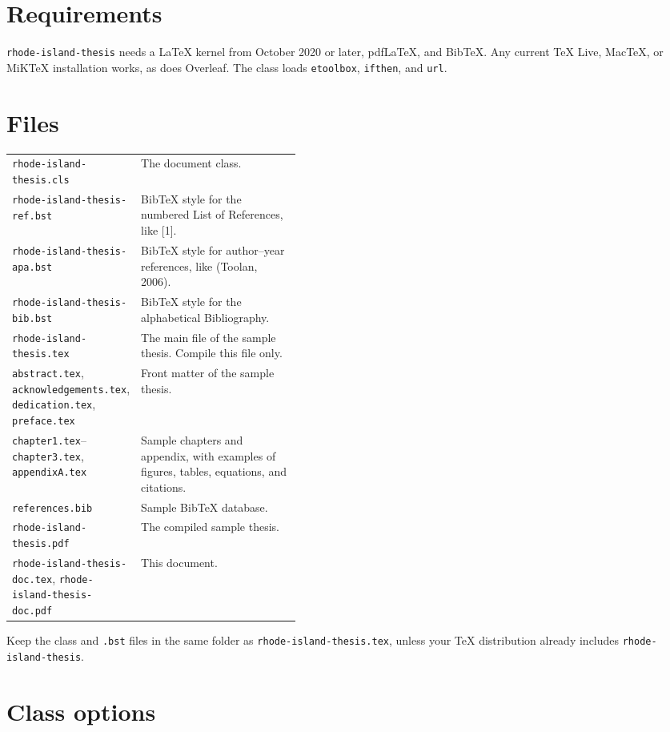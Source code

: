 \documentclass[11pt]{article}
\newcommand\cls{\texttt{rhode-island-thesis}}
\newcommand\file[1]{\texttt{#1}}
\begin{document}
\section{Requirements}

\cls{} needs a \LaTeX{} kernel from October 2020 or later, pdf\LaTeX, and
Bib\TeX.
Any current \TeX{} Live, Mac\TeX, or MiK\TeX{} installation works, as does
Overleaf.
The class loads \texttt{etoolbox}, \texttt{ifthen}, and \texttt{url}.

\section{Files}

\noindent
\begin{tabularx}{\linewidth}{@{}>{\raggedright\arraybackslash}p{0.42\linewidth}X@{}}
\toprule
\file{rhode-island-thesis.cls} & The document class. \\
\file{rhode-island-thesis-ref.bst} & Bib\TeX{} style for the numbered List of References, like [1]. \\
\file{rhode-island-thesis-apa.bst} & Bib\TeX{} style for author--year references, like (Toolan, 2006). \\
\file{rhode-island-thesis-bib.bst} & Bib\TeX{} style for the alphabetical Bibliography. \\
\midrule
\file{rhode-island-thesis.tex} & The main file of the sample thesis. Compile this file only. \\
\file{abstract.tex}, \file{acknowledgements.tex}, \file{dedication.tex}, \file{preface.tex}
  & Front matter of the sample thesis. \\
\file{chapter1.tex}--\file{chapter3.tex}, \file{appendixA.tex}
  & Sample chapters and appendix, with examples of figures, tables,
    equations, and citations. \\
\file{references.bib} & Sample Bib\TeX{} database. \\
\file{rhode-island-thesis.pdf} & The compiled sample thesis. \\
\file{rhode-island-thesis-doc.tex}, \file{rhode-island-thesis-doc.pdf} & This document. \\
\bottomrule
\end{tabularx}

\medskip
\noindent Keep the class and \file{.bst} files in the same folder as
\file{rhode-island-thesis.tex}, unless your \TeX{} distribution already includes \cls.

\section{Class options}\label{sec:options}
\end{document}

